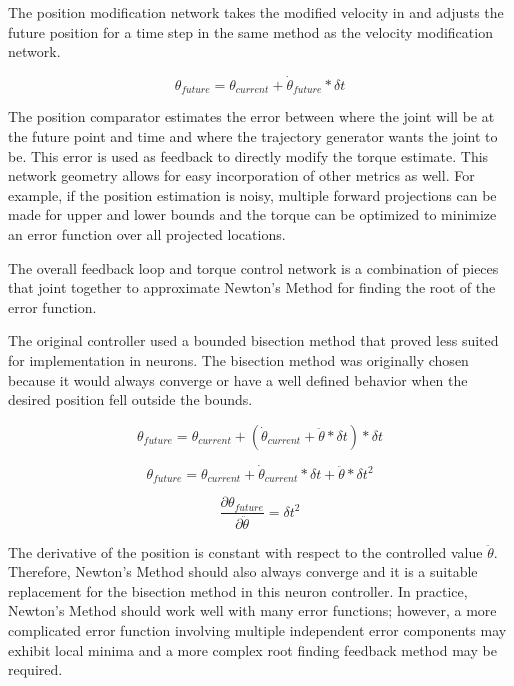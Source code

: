 
The position modification network takes the modified velocity in and adjusts the
future position for a time step in the same method as the velocity modification
network.

\begin{equation}
\theta_{future} = \theta_{current} + \dot{\theta}_{future} * \delta t
\end{equation}



The position comparator estimates the error between where the joint will be at
the future point and time and where the trajectory generator wants the joint
to be. This error is used as feedback to directly modify the torque estimate.
This network geometry allows for easy incorporation of other metrics as well.
For example, if the position estimation is noisy, multiple forward projections
can be made for upper and lower bounds and the torque can be optimized to 
minimize an error function over all projected locations.


The overall feedback loop and torque control network is a combination of pieces
that joint together to approximate
Newton's Method for finding the root of the error function.

The original 
controller used a bounded bisection method that proved less suited for 
implementation in neurons. The bisection method was originally chosen because
it would always converge or have a well defined behavior when the desired
position fell outside the bounds.

\begin{equation}
\theta_{future} = \theta_{current} + (\dot{\theta}_{current} + \ddot{\theta} * \delta t) * \delta t
\end{equation}

\begin{equation}
\theta_{future} = \theta_{current} + \dot{\theta}_{current} * \delta t + \ddot{\theta} * \delta t^{2}
\end{equation}

\begin{equation}
\dfrac{\partial \theta_{future}}{\partial \ddot{\theta}} = \delta t^{2}
\end{equation}

The derivative of the position is constant with respect to the controlled value
$\ddot{\theta}$. Therefore, Newton's Method should also always converge and it is a suitable replacement for the bisection method in this neuron
controller. In practice, Newton's Method should work well with many error functions; however,
a more complicated error function involving multiple independent error 
components may exhibit local minima and a more complex root finding feedback
method may be required.

